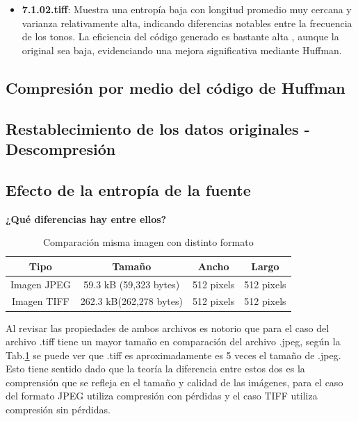 \documentclass[conference,onecolumn,12pt]{IEEEtran}
\numberwithin{equation}{subsection}
\begin{document}
\begin{itemize}
    \item \textbf{7.1.02.tiff}: Muestra una entropía baja con longitud promedio muy cercana y varianza relativamente alta, indicando diferencias notables entre la frecuencia de los tonos. La eficiencia del código generado es bastante alta , aunque la original sea baja, evidenciando una mejora significativa mediante Huffman.
    
\end{itemize}

\subsection{Compresión por medio del código de Huffman}

\subsection{Restablecimiento de los datos originales - Descompresión}

\subsection{Efecto de la entropía de la fuente}
\textbf{¿Qué diferencias hay entre ellos? }

\begin{table}[h!]
    \centering
    \caption{Comparación misma imagen con distinto formato }
    \label{tab:jpeg_vs_tiff}
    \begin{tabular}{cccc}
    \toprule
    \textbf{Tipo} & \textbf{Tamaño} & \textbf{Ancho} & \textbf{Largo} \\
    \midrule
    Imagen JPEG & 59.3 kB (59,323 bytes) & 512 pixels & 512 pixels \\
    Imagen TIFF & 262.3 kB(262,278 bytes)& 512 pixels & 512 pixels \\
    \bottomrule
    \end{tabular}
\end{table}


Al revisar las propiedades de ambos  archivos es notorio que para el caso del archivo .tiff tiene un mayor tamaño en comparación del archivo .jpeg, según la Tab.\ref{tab:jpeg_vs_tiff}  se puede ver que .tiff es aproximadamente es 5 veces el tamaño de .jpeg. Esto tiene sentido dado que la teoría la diferencia entre estos dos es la comprensión que se refleja en el tamaño y calidad de las imágenes, para el caso del formato JPEG utiliza compresión con pérdidas y el caso TIFF utiliza compresión sin pérdidas.
\end{document}
